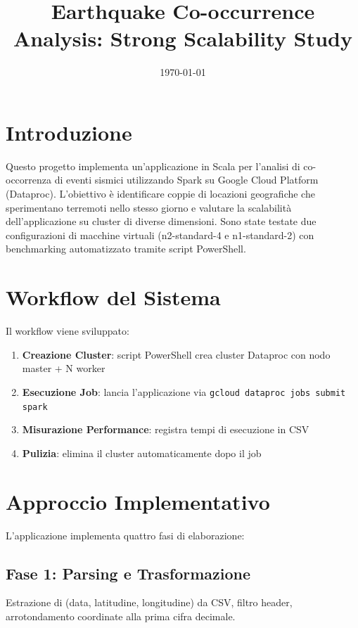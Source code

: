 \documentclass[8pt,a4paper]{article}
\title{Earthquake Co-occurrence Analysis: Strong Scalability Study}
\date{\today}
\begin{document}
\maketitle

\section{Introduzione}
Questo progetto implementa un'applicazione in Scala per l'analisi di co-occorrenza di eventi sismici utilizzando Spark su Google Cloud Platform (Dataproc). L'obiettivo è identificare coppie di locazioni geografiche che sperimentano terremoti nello stesso giorno e valutare la scalabilità dell'applicazione su cluster di diverse dimensioni. Sono state testate due configurazioni di macchine virtuali (n2-standard-4 e n1-standard-2) con benchmarking automatizzato tramite script PowerShell.

\section{Workflow del Sistema}

Il workflow viene sviluppato:

\begin{enumerate}
    \item \textbf{Creazione Cluster}: script PowerShell crea cluster Dataproc con nodo master + N worker
    \item \textbf{Esecuzione Job}: lancia l'applicazione via \texttt{gcloud dataproc jobs submit spark}
    \item \textbf{Misurazione Performance}: registra tempi di esecuzione in CSV
    \item \textbf{Pulizia}: elimina il cluster automaticamente dopo il job
\end{enumerate}

\section{Approccio Implementativo}

L'applicazione implementa quattro fasi di elaborazione:

\subsection{Fase 1: Parsing e Trasformazione}
Estrazione di (data, latitudine, longitudine) da CSV, filtro header, arrotondamento coordinate alla prima cifra decimale.
\end{document}
